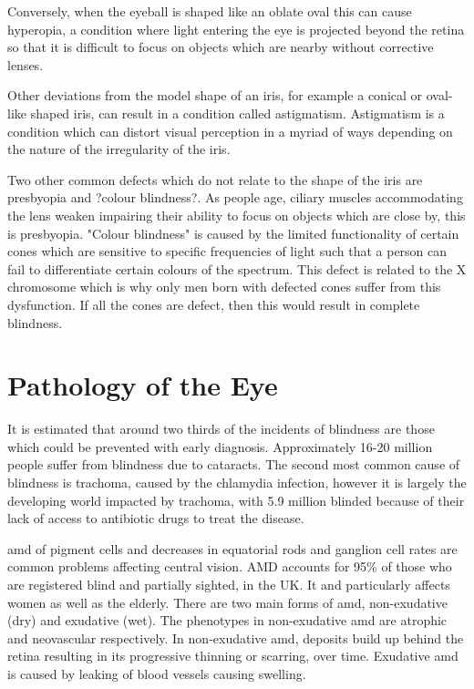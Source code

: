 Conversely, when the eyeball is shaped like an oblate oval this can cause
hyperopia, a condition where light entering the eye is projected beyond the
retina so that it is difficult to focus on objects which are nearby without
corrective lenses.

Other deviations from the model shape of an iris, for example a conical
or oval-like shaped iris, can result in a condition called astigmatism.
Astigmatism is a condition which can distort visual perception in a myriad
of ways depending on the nature of the irregularity of the iris.

Two other common defects which do not relate to the shape of the iris are
presbyopia and ?colour blindness?. As people age, ciliary muscles
accommodating the  lens weaken impairing their ability to focus on objects
which are close by, this is presbyopia. \cite{fisher1985ciliary} "Colour
blindness" is caused by the limited functionality of certain cones which are
sensitive to specific frequencies of light such that a person can fail to
differentiate certain colours of the spectrum. This defect is related to the X
chromosome which is why only men born with defected cones suffer from
this dysfunction.\cite{george1996clinical} If all the cones are defect, then
this would result in complete blindness.

\section{Pathology of the Eye}

It is estimated that around two thirds of the incidents of blindness are those
which could be prevented with early diagnosis.\cite{west2000looking}
Approximately 16-20 million people suffer from blindness due to
cataracts.\cite{west2000looking} The second most common cause of
blindness is trachoma, caused by the chlamydia infection, however it is
largely the developing world impacted by trachoma, with 5.9 million blinded
because of their lack of access to antibiotic drugs to treat the disease.
\cite{west2000looking}

\Gls{amd} of pigment cells and decreases in equatorial rods and ganglion cell
rates are common problems affecting central vision.\cite{gao1992aging}
AMD accounts for 95\% of those who are registered blind and partially sighted,
in the UK. It and particularly affects women as well as the elderly.\cite{o1998age,klein2005complement,west2000looking}
There are two main forms of \acrshort{amd}, non-exudative (dry) and exudative
(wet). The phenotypes in non-exudative \acrshort{amd} are atrophic and
neovascular respectively.\cite{kuno2011dry} In non-exudative \acrshort{amd},
deposits build up behind the retina resulting in its progressive
thinning or scarring, over time. Exudative \acrshort{amd} is caused
by leaking of blood vessels causing swelling.


